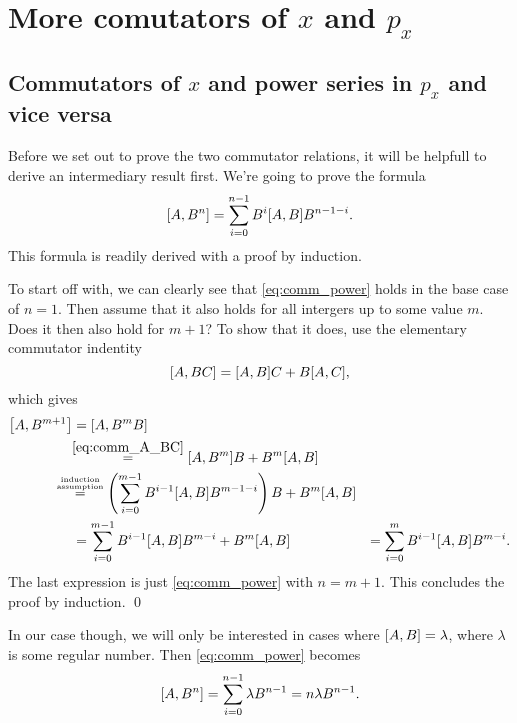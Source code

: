 \documentclass[11pt,letter, swedish, english
]{article}
\begin{document}
\section{More comutators of $x$ and $p_x$}

\subsection{Commutators of $x$ and power series in $p_x$ and vice versa}\label{sec:4a}
Before we set out to prove the two commutator relations, it will be
helpfull to derive an intermediary result first. We're going to prove
the formula
\begin{equation} \label{eq:comm_power}
\comm{A}{B^n} = \sum_{i=0}^{n-1} B^{i}\comm{A}{B}B^{n-1-i}.
\end{equation}
This formula is readily derived with a proof by induction. 

To start off with, we can clearly see that \eqref{eq:comm_power} holds
in the base case of $n=1$. Then assume that it also holds for all
intergers up to some value $m$. Does it then also hold for $m+1$?
To show that it does, use the elementary commutator
indentity
\begin{equation} \label{eq:comm_A_BC}
\comm{A}{BC} = \comm{A}{B}C+B\comm{A}{C},
\end{equation}
which gives
\begin{equation}
\begin{aligned}
\comm{A}{B^{m+1}} &= \comm{A}{B^{m}B} \\
&\hspace{-3pt}\stackrel{\eqref{eq:comm_A_BC}}{=} \comm{A}{B^{m}}B + B^m\comm{A}{B}\\
&\hspace{-14pt}\stackrel{\stackrel{\text{\tiny induction}}{\text{\tiny assumption}}}{=}
\left(\sum_{i=0}^{m-1} B^{i-1}\comm{A}{B}B^{m-1-i}\right) B + B^m\comm{A}{B}\\
&=\sum_{i=0}^{m-1} B^{i-1}\comm{A}{B}B^{m-i} + B^m\comm{A}{B}&=\sum_{i=0}^{m} B^{i-1}\comm{A}{B}B^{m-i}.
\end{aligned}
\end{equation}
The last expression is just \eqref{eq:comm_power} with $n=m+1$. This
concludes the proof by induction. \qed

In our case though, we will only be interested in cases where
$\comm{A}{B}=\lambda$, where $\lambda$ is some regular number. Then
\eqref{eq:comm_power} becomes 
\begin{equation} \label{eq:comm_power_c}
\comm{A}{B^n} = \sum_{i=0}^{n-1} \lambda B^{n-1} = n\lambda B^{n-1}.
\end{equation}
\end{document}
